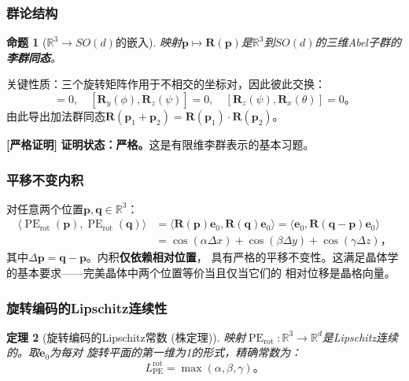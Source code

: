 \documentclass[11pt,a4paper]{article}
\newtheorem{theorem}{定理}[section]
\newtheorem{proposition}[theorem]{命题}
\theoremstyle{remark}
\DeclareMathOperator{\PE}{PE}
\newcommand{\R}{\mathbb{R}}
\newcommand{\rigorous}{\textnormal{\textbf{[严格证明]}}}
\begin{document}
\subsubsection{群论结构}

\begin{proposition}[$\R^3 \to SO(d)$的嵌入]
\label{prop:1.3.1}
映射$\mathbf{p} \mapsto \mathbf{R}(\mathbf{p})$是$\R^3$到$SO(d)$的三维Abel子群的
\textbf{李群同态}。
\end{proposition}

关键性质：三个旋转矩阵作用于不相交的坐标对，因此彼此交换：
\begin{equation}
    [\mathbf{R}_x(\theta), \mathbf{R}_y(\phi)] = 0,\quad
    [\mathbf{R}_y(\phi), \mathbf{R}_z(\psi)] = 0,\quad
    [\mathbf{R}_z(\psi), \mathbf{R}_x(\theta)] = 0。
\end{equation}
由此导出加法群同态$\mathbf{R}(\mathbf{p}_1 + \mathbf{p}_2) = \mathbf{R}(\mathbf{p}_1) \cdot \mathbf{R}(\mathbf{p}_2)$。

\rigorous{} \textbf{证明状态：严格。}这是有限维李群表示的基本习题。

\subsubsection{平移不变内积}

对任意两个位置$\mathbf{p}, \mathbf{q} \in \R^3$：
\begin{align}
    \langle \PE_{\text{rot}}(\mathbf{p}), \PE_{\text{rot}}(\mathbf{q}) \rangle
    &= \langle \mathbf{R}(\mathbf{p})\mathbf{e}_0, \mathbf{R}(\mathbf{q})\mathbf{e}_0 \rangle
     = \langle \mathbf{e}_0, \mathbf{R}(\mathbf{q} - \mathbf{p})\mathbf{e}_0 \rangle \nonumber\\
    &= \cos(\alpha\Delta x) + \cos(\beta\Delta y) + \cos(\gamma\Delta z)，
\end{align}
其中$\Delta\mathbf{p} = \mathbf{q} - \mathbf{p}$。内积\textbf{仅依赖相对位置}，
具有严格的平移不变性。这满足晶体学的基本要求——完美晶体中两个位置等价当且仅当它们的
相对位移是晶格向量。

\subsubsection{旋转编码的Lipschitz连续性}

\begin{theorem}[旋转编码的Lipschitz常数 (株定理)]
\label{thm:1.3.1}
映射$\PE_{\text{rot}}: \R^3 \to \R^d$是Lipschitz连续的。取$\mathbf{e}_0$为每对
旋转平面的第一维为1的形式，精确常数为：
\begin{equation}
    \boxed{
    L_{\PE}^{\text{rot}} = \max(\alpha, \beta, \gamma)
    }。
\end{equation}
\end{theorem}
\end{document}
